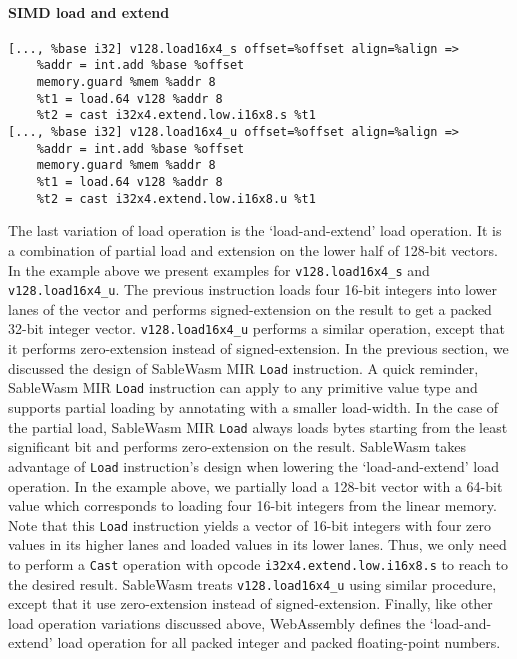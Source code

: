 \paragraph{SIMD load and extend} \quad
\begin{lstlisting}[basicstyle=\linespread{1}\small, language=SableWasmMIR]
[..., %base i32] v128.load16x4_s offset=%offset align=%align =>
    %addr = int.add %base %offset
    memory.guard %mem %addr 8
    %t1 = load.64 v128 %addr 8
    %t2 = cast i32x4.extend.low.i16x8.s %t1
[..., %base i32] v128.load16x4_u offset=%offset align=%align =>
    %addr = int.add %base %offset
    memory.guard %mem %addr 8
    %t1 = load.64 v128 %addr 8
    %t2 = cast i32x4.extend.low.i16x8.u %t1
\end{lstlisting}
The last variation of load operation is the `load-and-extend' load operation. It is a combination of partial load and extension on the lower half of 128-bit vectors. In the example above we present examples for \texttt{v128.load16x4\_s} and \texttt{v128.load16x4\_u}. The previous instruction loads four 16-bit integers into lower lanes of the vector and performs signed-extension on the result to get a packed 32-bit integer vector. \texttt{v128.load16x4\_u} performs a similar operation, except that it performs zero-extension instead of signed-extension. In the previous section, we discussed the design of SableWasm MIR \texttt{Load} instruction. A quick reminder, SableWasm MIR \texttt{Load} instruction can apply to any primitive value type and supports partial loading by annotating with a smaller load-width. In the case of the partial load, SableWasm MIR \texttt{Load} always loads bytes starting from the least significant bit and performs zero-extension on the result. SableWasm takes advantage of \texttt{Load} instruction's design when lowering the `load-and-extend' load operation. In the example above, we partially load a 128-bit vector with a 64-bit value which corresponds to loading four 16-bit integers from the linear memory. Note that this \texttt{Load} instruction yields a vector of 16-bit integers with four zero values in its higher lanes and loaded values in its lower lanes. Thus, we only need to perform a \texttt{Cast} operation with opcode \texttt{i32x4.extend.low.i16x8.s} to reach to the desired result. SableWasm treats \texttt{v128.load16x4\_u} using similar procedure, except that it use zero-extension instead of signed-extension. Finally, like other load operation variations discussed above, WebAssembly defines the `load-and-extend' load operation for all packed integer and packed floating-point numbers.

